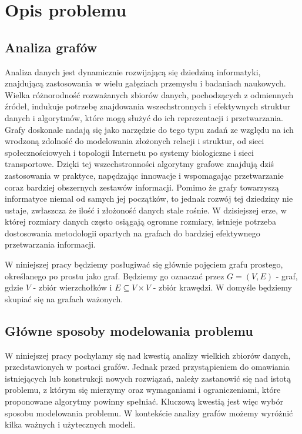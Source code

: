 \chapter{Opis problemu}

\section{Analiza grafów}

    Analiza danych jest dynamicznie rozwijającą się dziedziną informatyki, znajdującą zastosowania w wielu gałęziach przemysłu i badaniach naukowych. Wielka różnorodność rozważanych zbiorów danych, pochodzących z odmiennych źródeł, indukuje potrzebę znajdowania wszechstronnych i efektywnych struktur danych i algorytmów, które mogą służyć do ich reprezentacji i przetwarzania. Grafy doskonale nadają się jako narzędzie do tego typu zadań ze względu na ich wrodzoną zdolność do modelowania złożonych relacji i struktur, od sieci społecznościowych i topologii Internetu po systemy biologiczne i sieci transportowe. Dzięki tej wszechstronności algorytmy grafowe znajdują dziś zastosowania w praktyce, napędzając innowacje i wspomagając przetwarzanie coraz bardziej obszernych zestawów informacji. Pomimo że grafy towarzyszą informatyce niemal od samych jej początków, to jednak rozwój tej dziedziny nie ustaje, zwłaszcza że ilość i złożoność danych stale rośnie. W dzisiejszej erze, w której rozmiary danych często osiągają ogromne rozmiary, istnieje potrzeba dostosowania metodologii opartych na grafach do bardziej efektywnego przetwarzania informacji. 

    W niniejszej pracy będziemy posługiwać się głównie pojęciem grafu prostego, określanego po prostu jako graf. Będziemy go oznaczać przez $G = (V,E)$ - graf, gdzie $V$ - zbiór wierzchołków i $E \subseteq V \times V$ - zbiór krawędzi. W domyśle będziemy skupiać się na grafach ważonych.

\section{Główne sposoby modelowania problemu}
    W niniejszej pracy pochylamy się nad kwestią analizy wielkich zbiorów danych, przedstawionych w postaci grafów. Jednak przed przystąpieniem do omawiania istniejących lub konstrukcji nowych rozwiązań, należy zastanowić się nad istotą problemu, z którym się mierzymy oraz wymaganiami i ograniczeniami, które proponowane algorytmy powinny spełniać. Kluczową kwestią jest więc wybór sposobu modelowania problemu. W kontekście analizy grafów możemy wyróżnić kilka ważnych i użytecznych modeli.

